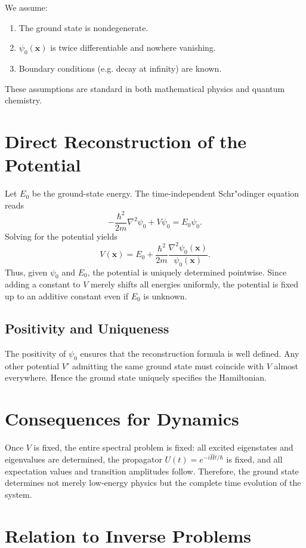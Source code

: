 \documentclass[11pt]{article}
\begin{document}
We assume:
\begin{enumerate}
\item The ground state is nondegenerate.
\item $\psi_0(\mathbf{x})$ is twice differentiable and nowhere vanishing.
\item Boundary conditions (e.g. decay at infinity) are known.
\end{enumerate}
These assumptions are standard in both mathematical physics and quantum chemistry.

\section{Direct Reconstruction of the Potential}
Let $E_0$ be the ground-state energy. The time-independent Schr"odinger equation reads
\begin{equation}
-\frac{\hbar^2}{2m}\nabla^2\psi_0 + V\psi_0 = E_0\psi_0.
\end{equation}
Solving for the potential yields
\begin{equation}
V(\mathbf{x}) = E_0 + \frac{\hbar^2}{2m}\frac{\nabla^2\psi_0(\mathbf{x})}{\psi_0(\mathbf{x})}.
\end{equation}
Thus, given $\psi_0$ and $E_0$, the potential is uniquely determined pointwise. Since adding a constant to $V$ merely shifts all energies uniformly, the potential is fixed up to an additive constant even if $E_0$ is unknown.

\subsection{Positivity and Uniqueness}
The positivity of $\psi_0$ ensures that the reconstruction formula is well defined. Any other potential $V'$ admitting the same ground state must coincide with $V$ almost everywhere. Hence the ground state uniquely specifies the Hamiltonian.

\section{Consequences for Dynamics}
Once $V$ is fixed, the entire spectral problem is fixed: all excited eigenstates and eigenvalues are determined, the propagator $U(t)=e^{-i\hat H t/\hbar}$ is fixed, and all expectation values and transition amplitudes follow. Therefore, the ground state determines not merely low-energy physics but the complete time evolution of the system.

\section{Relation to Inverse Problems}
\end{document}
